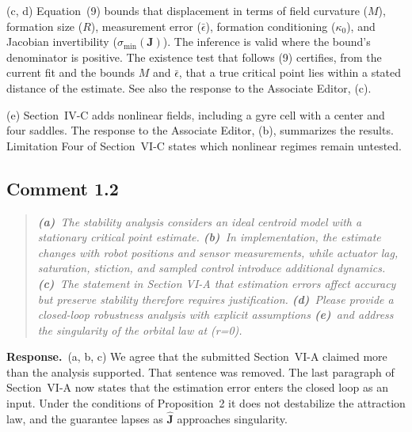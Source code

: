 \documentclass[10pt]{article}
\newcommand{\resp}{\par\textbf{Response.}~}
\begin{document}
(c, d) Equation~(9) bounds that displacement in terms of field curvature ($M$), formation size ($R$), measurement error ($\bar{\epsilon}$), formation conditioning ($\kappa_0$), and Jacobian invertibility ($\sigma_{\min}(\mathbf{J})$). The inference is valid where the bound's denominator is positive. The existence test that follows (9) certifies, from the current fit and the bounds $M$ and $\bar{\epsilon}$, that a true critical point lies within a stated distance of the estimate. See also the response to the Associate Editor, (c).

(e) Section~IV-C adds nonlinear fields, including a gyre cell with a center and four saddles. The response to the Associate Editor, (b), summarizes the results. Limitation Four of Section~VI-C states which nonlinear regimes remain untested.

\subsection*{Comment 1.2}

\begin{quote}\itshape
\textbf{(a)}~The stability analysis considers an ideal centroid model with a stationary critical point estimate.
\textbf{(b)}~In implementation, the estimate changes with robot positions and sensor measurements, while actuator lag, saturation, stiction, and sampled control introduce additional dynamics.
\textbf{(c)}~The statement in Section VI-A that estimation errors affect accuracy but preserve stability therefore requires justification.
\textbf{(d)}~Please provide a closed-loop robustness analysis with explicit assumptions
\textbf{(e)}~and address the singularity of the orbital law at (r=0).
\end{quote}


\resp (a, b, c) We agree that the submitted Section~VI-A claimed more than the analysis supported. That sentence was removed. The last paragraph of Section~VI-A now states that the estimation error enters the closed loop as an input. Under the conditions of Proposition~2 it does not destabilize the attraction law, and the guarantee lapses as $\hat{\mathbf{J}}$ approaches singularity.
\end{document}
